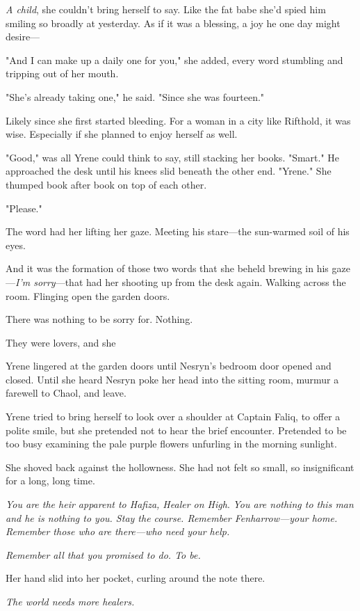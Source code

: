 \emph{A child}, she couldn't bring herself to say. Like the fat babe she'd spied him smiling so broadly at yesterday. As if it was a blessing, a joy he one day might desire---

"And I can make up a daily one for you," she added, every word stumbling and tripping out of her mouth.

"She's already taking one," he said. "Since she was fourteen."

Likely since she first started bleeding. For a woman in a city like Rifthold, it was wise. Especially if she planned to enjoy herself as well.

"Good," was all Yrene could think to say, still stacking her books. "Smart." He approached the desk until his knees slid beneath the other end. "Yrene." She thumped book after book on top of each other.

"Please."

The word had her lifting her gaze. Meeting his stare---the sun-warmed soil of his eyes.

And it was the formation of those two words that she beheld brewing in his gaze---\emph{I'm sorry}---that had her shooting up from the desk again. Walking across the room. Flinging open the garden doors.

There was nothing to be sorry for. Nothing.

They were lovers, and she 

Yrene lingered at the garden doors until Nesryn's bedroom door opened and closed. Until she heard Nesryn poke her head into the sitting room, murmur a farewell to Chaol, and leave.

Yrene tried to bring herself to look over a shoulder at Captain Faliq, to offer a polite smile, but she pretended not to hear the brief encounter. Pretended to be too busy examining the pale purple flowers unfurling in the morning sunlight.

She shoved back against the hollowness. She had not felt so small, so
 insignificant for a long, long time.

\emph{You are the heir apparent to Hafiza, Healer on High}. \emph{You are nothing to this man and he is nothing to you. Stay the course. Remember Fenharrow---your home. Remember those who are there---who need your help.}

\emph{Remember all that you promised to do. To be.}

Her hand slid into her pocket, curling around the note there.

\emph{The world needs more healers.}

